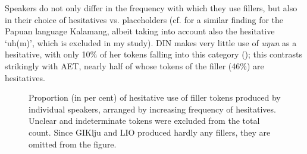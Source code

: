 \documentclass[output=paper]{langscibook}
\begin{document}
Speakers do not only differ in the frequency with which they use fillers, but also in their choice of hesitatives vs. placeholders (cf. \cite{chapters/visser} for a similar finding for the Papuan language Kalamang, albeit taking into account also the hesitative ‘uh(m)’, which is excluded in my study). DIN makes very little use of \textit{uŋun} as a hesitative, with only 10\% of her tokens falling into this category (); this contrasts strikingly with AET, nearly half of whose tokens of the filler (46\%) are hesitatives. 

\begin{figure}
\caption{Proportion (in per cent) of hesitative use of filler tokens produced by individual speakers, arranged by increasing frequency of hesitatives. Unclear and indeterminate tokens were excluded from the total count. Since GIKlju and LIO produced hardly any fillers, they are omitted from the figure.}
\label{fig:pakendorf:18}
\end{figure}
\end{document}
